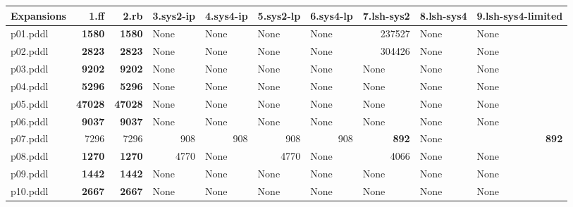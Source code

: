 \documentclass{article}
\begin{document}
\begin{tabular}{@{}lrrrrrrrrr@{}}
Expansions & 1.ff & 2.rb & 3.sys2-ip & 4.sys4-ip & 5.sys2-lp & 6.sys4-lp & 7.lsh-sys2 & 8.lsh-sys4 & 9.lsh-sys4-limited \\
\midrule
p01.pddl & \textbf{1580} & \textbf{1580} & \multicolumn{1}{|l|}{None} & \multicolumn{1}{|l|}{None} & \multicolumn{1}{|l|}{None} & \multicolumn{1}{|l|}{None} & 237527 & \multicolumn{1}{|l|}{None} & \multicolumn{1}{|l|}{None} \\
p02.pddl & \textbf{2823} & \textbf{2823} & \multicolumn{1}{|l|}{None} & \multicolumn{1}{|l|}{None} & \multicolumn{1}{|l|}{None} & \multicolumn{1}{|l|}{None} & 304426 & \multicolumn{1}{|l|}{None} & \multicolumn{1}{|l|}{None} \\
p03.pddl & \textbf{9202} & \textbf{9202} & \multicolumn{1}{|l|}{None} & \multicolumn{1}{|l|}{None} & \multicolumn{1}{|l|}{None} & \multicolumn{1}{|l|}{None} & \multicolumn{1}{|l|}{None} & \multicolumn{1}{|l|}{None} & \multicolumn{1}{|l|}{None} \\
p04.pddl & \textbf{5296} & \textbf{5296} & \multicolumn{1}{|l|}{None} & \multicolumn{1}{|l|}{None} & \multicolumn{1}{|l|}{None} & \multicolumn{1}{|l|}{None} & \multicolumn{1}{|l|}{None} & \multicolumn{1}{|l|}{None} & \multicolumn{1}{|l|}{None} \\
p05.pddl & \textbf{47028} & \textbf{47028} & \multicolumn{1}{|l|}{None} & \multicolumn{1}{|l|}{None} & \multicolumn{1}{|l|}{None} & \multicolumn{1}{|l|}{None} & \multicolumn{1}{|l|}{None} & \multicolumn{1}{|l|}{None} & \multicolumn{1}{|l|}{None} \\
p06.pddl & \textbf{9037} & \textbf{9037} & \multicolumn{1}{|l|}{None} & \multicolumn{1}{|l|}{None} & \multicolumn{1}{|l|}{None} & \multicolumn{1}{|l|}{None} & \multicolumn{1}{|l|}{None} & \multicolumn{1}{|l|}{None} & \multicolumn{1}{|l|}{None} \\
p07.pddl & 7296 & 7296 & 908 & 908 & 908 & 908 & \textbf{892} & \multicolumn{1}{|l|}{None} & \textbf{892} \\
p08.pddl & \textbf{1270} & \textbf{1270} & 4770 & \multicolumn{1}{|l|}{None} & 4770 & \multicolumn{1}{|l|}{None} & 4066 & \multicolumn{1}{|l|}{None} & \multicolumn{1}{|l|}{None} \\
p09.pddl & \textbf{1442} & \textbf{1442} & \multicolumn{1}{|l|}{None} & \multicolumn{1}{|l|}{None} & \multicolumn{1}{|l|}{None} & \multicolumn{1}{|l|}{None} & \multicolumn{1}{|l|}{None} & \multicolumn{1}{|l|}{None} & \multicolumn{1}{|l|}{None} \\
p10.pddl & \textbf{2667} & \textbf{2667} & \multicolumn{1}{|l|}{None} & \multicolumn{1}{|l|}{None} & \multicolumn{1}{|l|}{None} & \multicolumn{1}{|l|}{None} & \multicolumn{1}{|l|}{None} & \multicolumn{1}{|l|}{None} & \multicolumn{1}{|l|}{None} \\

\end{tabular}
\end{document}
